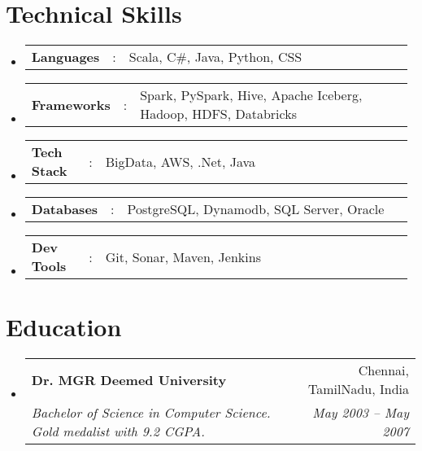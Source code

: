 \documentclass[a4paper,11pt]{article}
\makeatletter
\newcommand{\resumeSectionType}[3]{
  \item\begin{tabular*}{0.96\textwidth}[t]{
    p{0.15\linewidth}p{0.02\linewidth}p{0.81\linewidth}
  }
    \textbf{#1} & #2 & #3
  \end{tabular*}\vspace{-2pt}
}
\newcommand{\resumeQuadHeading}[4]{
  \item
  \begin{tabular*}{0.96\textwidth}[t]{l@{\extracolsep{\fill}}r}
    \textbf{#1} & #2 \\
    \textit{\small#3} & \textit{\small #4} \\
  \end{tabular*}
}
\newcommand{\resumeHeadingListStart}{
  \begin{itemize}[leftmargin=0.15in, label={}]
}
\newcommand{\resumeHeadingListEnd}{\end{itemize}}
\makeatother
\begin{document}
\section{Technical Skills}
  \resumeHeadingListStart{}
    \resumeSectionType{Languages}{:}{Scala, C\#, Java, Python, CSS}
    \resumeSectionType{Frameworks}{:}{Spark, PySpark, Hive, Apache Iceberg, Hadoop, HDFS, Databricks}
    \resumeSectionType{Tech Stack}{:}{BigData, AWS, .Net, Java}
    \resumeSectionType{Databases}{:}{PostgreSQL, Dynamodb, SQL Server, Oracle}
    \resumeSectionType{Dev Tools}{:}{Git, Sonar, Maven, Jenkins}
  \resumeHeadingListEnd{}



\section{Education}
  \resumeHeadingListStart{}
    \resumeQuadHeading{Dr. MGR Deemed University}{Chennai, TamilNadu, India}
    {Bachelor of Science in Computer Science. Gold medalist with 9.2 CGPA.}{May 2003 -- May 2007}
  \resumeHeadingListEnd{}
\end{document}
